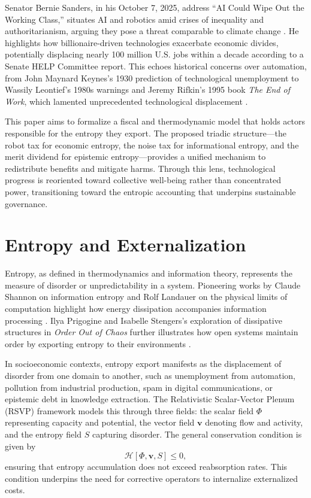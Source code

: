 \documentclass[12pt]{article}
\begin{document}
Senator Bernie Sanders, in his October 7, 2025, address ``AI Could Wipe Out the Working Class,'' situates AI and robotics amid crises of inequality and authoritarianism, arguing they pose a threat comparable to climate change \citep{sanders2025ai}. He highlights how billionaire-driven technologies exacerbate economic divides, potentially displacing nearly 100 million U.S. jobs within a decade according to a Senate HELP Committee report. This echoes historical concerns over automation, from John Maynard Keynes's 1930 prediction of technological unemployment to Wassily Leontief's 1980s warnings and Jeremy Rifkin's 1995 book \emph{The End of Work}, which lamented unprecedented technological displacement \citep{keynes1930economic, leontief1983technological, rifkin1995end}.

This paper aims to formalize a fiscal and thermodynamic model that holds actors responsible for the entropy they export. The proposed triadic structure—the robot tax for economic entropy, the noise tax for informational entropy, and the merit dividend for epistemic entropy—provides a unified mechanism to redistribute benefits and mitigate harms. Through this lens, technological progress is reoriented toward collective well-being rather than concentrated power, transitioning toward the entropic accounting that underpins sustainable governance.

\section{Entropy and Externalization}
Entropy, as defined in thermodynamics and information theory, represents the measure of disorder or unpredictability in a system. Pioneering works by Claude Shannon on information entropy and Rolf Landauer on the physical limits of computation highlight how energy dissipation accompanies information processing \citep{shannon1949communication, landauer1961irreversibility}. Ilya Prigogine and Isabelle Stengers's exploration of dissipative structures in \emph{Order Out of Chaos} further illustrates how open systems maintain order by exporting entropy to their environments \citep{prigogine1984order}.

In socioeconomic contexts, entropy export manifests as the displacement of disorder from one domain to another, such as unemployment from automation, pollution from industrial production, spam in digital communications, or epistemic debt in knowledge extraction. The Relativistic Scalar-Vector Plenum (RSVP) framework models this through three fields: the scalar field $\Phi$ representing capacity and potential, the vector field $\mathbf{v}$ denoting flow and activity, and the entropy field $S$ capturing disorder. The general conservation condition is given by
\[
\mathcal{H}[\Phi, \mathbf{v}, S] \le 0,
\]
ensuring that entropy accumulation does not exceed reabsorption rates. This condition underpins the need for corrective operators to internalize externalized costs.
\end{document}
